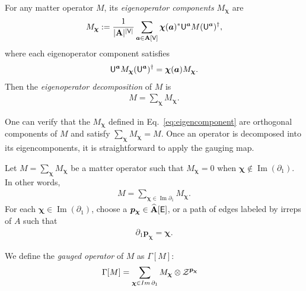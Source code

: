 \documentclass[11pt]{article}
\begin{document}
\begin{definition} \label{def:eigen-decomp}

For any matter operator $M$, its \emph{eigenoperator components} $M_{\bm{\bm{\chi}}}$ are
\begin{align}
    M_{\bm{\bm{\chi}}} := \frac{1}{|\mathbf{A}|^{|\mathsf{V}|}}\sum_{\bm{a}\in\mathbf{A}[\mathsf{V}]}\bm{\bm{\chi}}(\bm a)^*\mathsf{U}^{\bm{a}}M (\mathsf{U}^{\bm{a}})^\dagger,
    \label{eq:eigencomponent}
\end{align}
where each eigenoperator component satisfies
\begin{align}
    \mathsf{U}^{\bm{a}}M_{\bm{\bm{\chi}}} (\mathsf{U}^{\bm{a}})^\dagger = \bm{\bm{\chi}}(\bm a ) M_{\bm{\bm{\chi}}}.
\end{align}
Then the \emph{eigenoperator decomposition} of $M$ is
\begin{align}
    M=\sum_{\bm{\bm{\chi}} }M_{\bm{\bm{\chi}}}.
    \label{eq:eigenoperator-decomposition}
\end{align}
\end{definition}
One can verify that the $M_{\bm{\bm{\chi}}}$ defined in Eq.~\eqref{eq:eigencomponent} are orthogonal components of $M$ and satisfy $\sum_{\bm{\bm{\chi}}} M_{\bm{\bm{\chi}}}=M$. Once an operator is decomposed into its eigencomponents, it is straightforward to apply the gauging map.

\begin{definition}
\label{def:gauged-operator}
Let $M=\sum_{\bm{\bm{\chi}}}M_{\bm{\bm{\chi}}}$ be a matter operator such that 
$M_{\bm{\bm{\chi}}} = 0$ when $\bm{\bm{\chi}}\notin\mathop{Im} (\partial_1)$. In other words,
\begin{align}
M=\sum_{\bm{\bm{\chi}} \in \mathop{Im} \partial_1} M_{\bm{\bm{\chi}}}  .
\end{align}
For each $\bm{\bm{\chi}} \in \mathop{Im} (\partial_1)$, choose a $\bm{p}_{\bm{\bm{\chi}}}\in \widehat{\mathbf{A}}[\mathsf{E}]$, or a path of edges labeled by irreps of $A$ such that
\begin{align}
    \partial_1\bm{p}_{\bm{\bm{\chi}}} = \bm{\bm{\chi}}.
\end{align}

We define the \emph{gauged operator} of $M$ as $\Gamma[M]$:
\begin{align}
    \Gamma[M]&= \sum_{\bm{\bm{\chi}} \in \mathop{Im} \partial_1} M_{\bm{\bm{\chi}}} \otimes \mathcal{Z}^{\bm{p}_{\bm{\bm{\chi}}}}
\end{align}


\end{definition}
\end{document}
